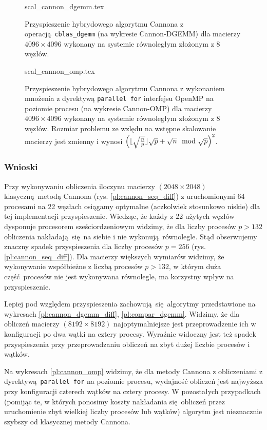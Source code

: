 \begin{figure}[H]
\centering
\footnotesize
{scal_cannon_dgemm.tex}
\caption{Przyspieszenie hybrydowego algorytmu Cannona z operacją \texttt{cblas\_dgemm} (na wykresie Cannon-DGEMM) dla macierzy \(4096\times 4096\) wykonany na systemie równoległym złożonym z 8 węzłów.}
\label{pl:scal_cannon_dgemm}
\end{figure}

\begin{figure}[H]
\centering
\footnotesize
{scal_cannon_omp.tex}
\caption{Przyspieszenie hybrydowego algorytmu Cannona z wykonaniem mnożenia z dyrektywą \texttt{parallel for} interfejsu OpenMP na poziomie procesu (na wykresie Cannon-OMP) dla macierzy \(4096\times 4096\) wykonany na systemie równoległym złożonym z 8 węzłów. Rozmiar problemu ze wzlędu na wstępne skalowanie macierzy jest zmienny i wynosi \(\left( \lfloor \sqrt{\frac{n}{p}} \rfloor \sqrt{p} + \sqrt{n}\mod{\sqrt{p}}\right)^2\). }
\label{pl:scal_cannon_omp}
\end{figure}

\subsubsection{Wnioski}
Przy wykonywaniu obliczenia iloczynu macierzy \((2048\times 2048)\) klasyczną metodą Cannona (rys. \ref{pl:cannon_seq_diff}) z uruchomionymi 64 procesami na 22 węzłach osiągamy optymalne (aczkolwiek stosunkowo niskie) dla tej implementacji przyspieszenie. Wiedząc, że każdy z 22 użytych węzłów dysponuje procesorem sześciordzeniowym widzimy, że dla liczby procesów \(p>132\) obliczenia nakładają się na siebie i nie wykonują równolegle. Stąd obserwujemy znaczny spadek przyspieszenia dla liczby procesów \(p=256\) (rys. \ref{pl:cannon_seq_diff}). Dla macierzy większych wymiarów widzimy, że wykonywanie współbieżne z liczbą procesów \(p>132\), w którym duża część procesów nie jest wykonywana równolegle, ma korzystny wpływ na przyspieszenie.


Lepiej pod względem przyspieszenia zachowują się algorytmy przedstawione na wykresach \ref{pl:cannon_dgemm_diff}, \ref{pl:compar_dgemm}. Widzimy, że dla obliczeń macierzy \((8192\times8192)\) najoptymalniejsze jest przeprowadzenie ich w konfiguracji po dwa wątki na cztery procesy. Wyraźnie widoczny jest też spadek przyspieszenia przy przeprowadzaniu obliczeń na zbyt dużej liczbie procesów i wątków.


Na wykresach \ref{pl:cannon_omp} widzimy, że dla metody Cannona z obliczeniami z dyrektywą \texttt{parallel for} na poziomie procesu, wydajność obliczeń jest najwyższa przy konfiguracji czterech wątków na cztery procesy. W pozostałych przypadkach (pomijąc te, w których ponosimy koszty nakładania się obliczeń przez uruchomienie zbyt wielkiej liczby procesów lub wątków) algorytm jest nieznacznie szybszy od klasycznej metody Cannona.


